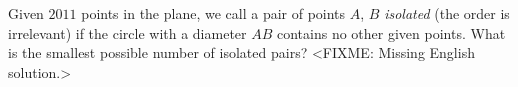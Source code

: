 \problem
Given $2011$ points in the plane, we call a pair of points $A$, $B$
\emph{isolated} (the order is irrelevant) if the circle with a diameter $AB$
contains no other given points.
What is the smallest possible number of isolated pairs?
\solution
<FIXME: Missing English solution.>
\endproblem
